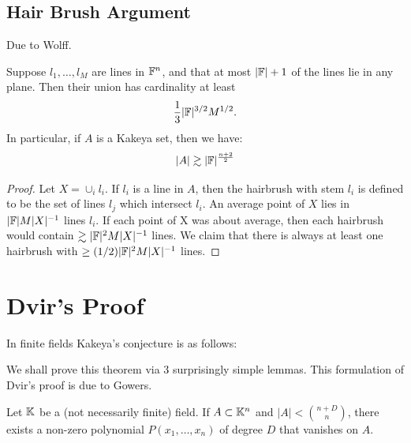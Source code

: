 \subsection{Hair Brush Argument}
Due to Wolff. \cite{WOLFF1995}

\begin{theorem}
    Suppose $l_1, \dots , l_M$ are lines in $\mathbb F^n$, and that at most $|\mathbb F| +1$ of the lines lie in any plane.
    Then their union has cardinality at least 
    \[
        \frac{1}{3}    |\mathbb F|^{3/2} M^{1/2}.
    \]
    In particular, if $A$ is a Kakeya set, then we have:
    \[
        |A| \gtrsim |\mathbb F|^{\frac{n+2}{2}}    
    \]
\end{theorem}
\begin{proof}
    Let $X = \cup_i l_i$. If $l_i$ is a line in $A$, then the hairbrush with stem $l_i$ is
    defined to be the set of lines $l_j$ which intersect $l_i$. An average point of $X$ lies in $|\mathbb F|M |X|^{-1}$ lines $l_i$.
    If each point of X was about average, then each hairbrush would contain $\gtrsim |\mathbb F|^2 M |X|^{-1}$ lines. We claim
    that there is always at least one hairbrush with $\geq (1/2)|\mathbb F|^2M |X|^{-1}$ lines.  

\end{proof}

\section{Dvir's Proof}

In finite fields Kakeya's conjecture is as follows:

We shall prove this theorem via 3 surprisingly simple lemmas. This formulation of Dvir's proof is due to Gowers.\cite{GOW2020}

\begin{lemma} 
Let $\mathbb K$ be a (not necessarily finite) field. If $A \subset \mathbb K^n$ and $|A| < {{n+D} \choose {n}}$, there exists a non-zero polynomial $P(x_1,\dots, x_n)$ of degree $D$ that vanishes on $A$. \label{paramcounting}
\end{lemma}

